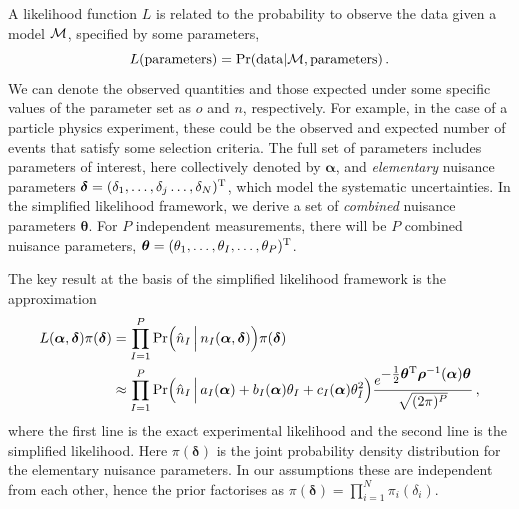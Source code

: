 \documentclass[11pt]{article}
\newcommand{\be}{\begin{equation}}
\newcommand{\ee}{\end{equation}}
\begin{document}
A likelihood function $L$ is related to the probability to observe the data given a model $\cal M$, specified by some parameters,
\be L({\rm parameters})={\rm Pr}({\rm data}|{\cal M},{\rm parameters})\,.\ee
We can denote the observed quantities and those expected under some specific values of the parameter set as $o$ and $n$, respectively. For example, in the case of
a particle physics experiment, these could be the observed and expected number of events that satisfy some selection criteria.
The full set of parameters includes parameters of interest, here collectively denoted by $\bm{\alpha}$, and \textit{elementary} nuisance parameters $\bm{\delta}=(\delta_1,\ldots,\delta_{j}\ldots,\delta_N)^{\rm{T}}$, which model the systematic uncertainties.
In the simplified likelihood framework, we derive a set of \textit{combined} nuisance parameters $\bm{\theta}$. For $P$ independent measurements, there will be $P$ combined nuisance parameters, $\bm{\theta}=(\theta_1,\ldots,\theta_{I},\ldots,\theta_P)^{\rm{T}}$.


The key result at the basis of  the simplified likelihood framework is the approximation
\begin{align}
L(\bm{\alpha},\bm{\delta} )\pi(\bm{\delta}) & =
\prod_{I=1}^P{\rm Pr}\Big(  \hat n_I\,\Big|\,n_I(\bm{\alpha},\bm{\delta})  \Big) \pi(\bm{\delta}) \label{eq:EL} \\ & \approx
\prod_{I=1}^P{\rm Pr}\Big(\hat n_I\,\Big|\,a_{I}(\bm \alpha)+b_I(\bm \alpha)\theta_I+c_I(\bm \alpha)\theta_I^2  \Big)
\frac{ e^{{\textstyle-\frac{1}{2}\bm \theta^{\rm T} \bm{\rho}^{-1}(\bm \alpha) \bm \theta}}}{\sqrt{(2\pi)^P }} \,, \label{eq:SL_master}
\end{align}
where the first line is the exact experimental likelihood and the second line is the simplified likelihood. Here $\pi(\bm \delta)$ is the joint probability density distribution for the elementary nuisance parameters. In our assumptions  these are independent from each other, hence the prior factorises as $\pi(\bm \delta)=\prod_{i=1}^N \pi_i(\delta_i)$.
\end{document}
